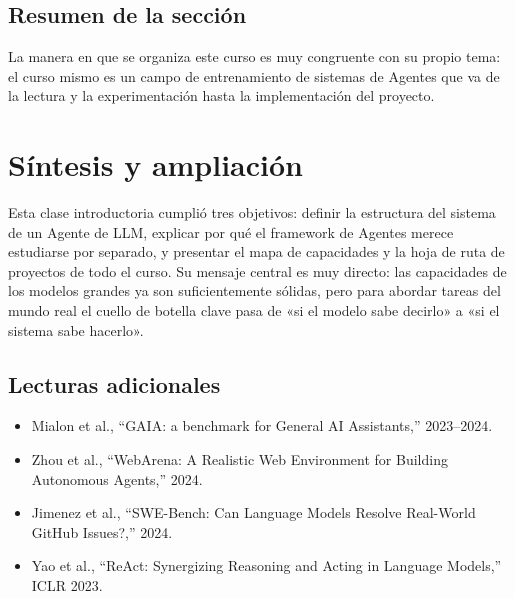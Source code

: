 \documentclass[a4paper]{article}
\begin{document}
\subsection{Resumen de la sección}

La manera en que se organiza este curso es muy congruente con su propio tema: el curso mismo es un campo de entrenamiento de sistemas de Agentes que va de la lectura y la experimentación hasta la implementación del proyecto.

\section{Síntesis y ampliación}

Esta clase introductoria cumplió tres objetivos: definir la estructura del sistema de un Agente de LLM, explicar por qué el framework de Agentes merece estudiarse por separado, y presentar el mapa de capacidades y la hoja de ruta de proyectos de todo el curso. Su mensaje central es muy directo: las capacidades de los modelos grandes ya son suficientemente sólidas, pero para abordar tareas del mundo real el cuello de botella clave pasa de «si el modelo sabe decirlo» a «si el sistema sabe hacerlo».

\subsection{Lecturas adicionales}

\begin{itemize}
    \item Mialon et al., ``GAIA: a benchmark for General AI Assistants,'' 2023--2024.
    \item Zhou et al., ``WebArena: A Realistic Web Environment for Building Autonomous Agents,'' 2024.
    \item Jimenez et al., ``SWE-Bench: Can Language Models Resolve Real-World GitHub Issues?,'' 2024.
    \item Yao et al., ``ReAct: Synergizing Reasoning and Acting in Language Models,'' ICLR 2023.
\end{itemize}
\end{document}

